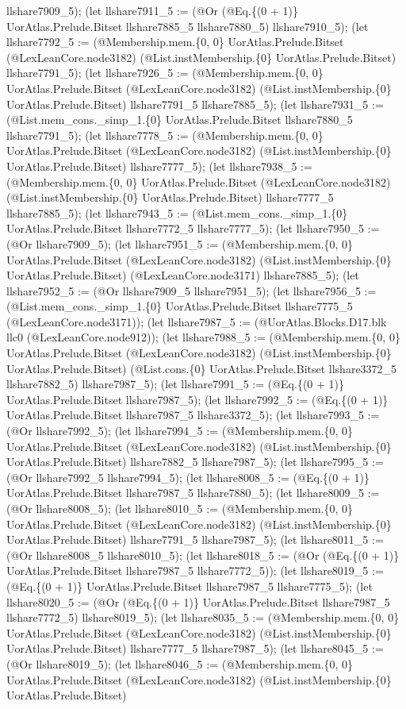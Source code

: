 \documentclass[11pt]{article}
\begin{document}
llshare7909\_5); (let llshare7911\_5 := (@Or (@Eq.\{(0 + 1)\} UorAtlas.Prelude.Bitset llshare7885\_5 llshare7880\_5) llshare7910\_5); (let llshare7792\_5 := (@Membership.mem.\{0, 0\} UorAtlas.Prelude.Bitset (@LexLeanCore.node3182) (@List.instMembership.\{0\} UorAtlas.Prelude.Bitset) llshare7791\_5); (let llshare7926\_5 := (@Membership.mem.\{0, 0\} UorAtlas.Prelude.Bitset (@LexLeanCore.node3182) (@List.instMembership.\{0\} UorAtlas.Prelude.Bitset) llshare7791\_5 llshare7885\_5); (let llshare7931\_5 := (@List.mem\_cons.\_simp\_1.\{0\} UorAtlas.Prelude.Bitset llshare7880\_5 llshare7791\_5); (let llshare7778\_5 := (@Membership.mem.\{0, 0\} UorAtlas.Prelude.Bitset (@LexLeanCore.node3182) (@List.instMembership.\{0\} UorAtlas.Prelude.Bitset) llshare7777\_5); (let llshare7938\_5 := (@Membership.mem.\{0, 0\} UorAtlas.Prelude.Bitset (@LexLeanCore.node3182) (@List.instMembership.\{0\} UorAtlas.Prelude.Bitset) llshare7777\_5 llshare7885\_5); (let llshare7943\_5 := (@List.mem\_cons.\_simp\_1.\{0\} UorAtlas.Prelude.Bitset llshare7772\_5 llshare7777\_5); (let llshare7950\_5 := (@Or llshare7909\_5); (let llshare7951\_5 := (@Membership.mem.\{0, 0\} UorAtlas.Prelude.Bitset (@LexLeanCore.node3182) (@List.instMembership.\{0\} UorAtlas.Prelude.Bitset) (@LexLeanCore.node3171) llshare7885\_5); (let llshare7952\_5 := (@Or llshare7909\_5 llshare7951\_5); (let llshare7956\_5 := (@List.mem\_cons.\_simp\_1.\{0\} UorAtlas.Prelude.Bitset llshare7775\_5 (@LexLeanCore.node3171)); (let llshare7987\_5 := (@UorAtlas.Blocks.D17.blk llc0 (@LexLeanCore.node912)); (let llshare7988\_5 := (@Membership.mem.\{0, 0\} UorAtlas.Prelude.Bitset (@LexLeanCore.node3182) (@List.instMembership.\{0\} UorAtlas.Prelude.Bitset) (@List.cons.\{0\} UorAtlas.Prelude.Bitset llshare3372\_5 llshare7882\_5) llshare7987\_5); (let llshare7991\_5 := (@Eq.\{(0 + 1)\} UorAtlas.Prelude.Bitset llshare7987\_5); (let llshare7992\_5 := (@Eq.\{(0 + 1)\} UorAtlas.Prelude.Bitset llshare7987\_5 llshare3372\_5); (let llshare7993\_5 := (@Or llshare7992\_5); (let llshare7994\_5 := (@Membership.mem.\{0, 0\} UorAtlas.Prelude.Bitset (@LexLeanCore.node3182) (@List.instMembership.\{0\} UorAtlas.Prelude.Bitset) llshare7882\_5 llshare7987\_5); (let llshare7995\_5 := (@Or llshare7992\_5 llshare7994\_5); (let llshare8008\_5 := (@Eq.\{(0 + 1)\} UorAtlas.Prelude.Bitset llshare7987\_5 llshare7880\_5); (let llshare8009\_5 := (@Or llshare8008\_5); (let llshare8010\_5 := (@Membership.mem.\{0, 0\} UorAtlas.Prelude.Bitset (@LexLeanCore.node3182) (@List.instMembership.\{0\} UorAtlas.Prelude.Bitset) llshare7791\_5 llshare7987\_5); (let llshare8011\_5 := (@Or llshare8008\_5 llshare8010\_5); (let llshare8018\_5 := (@Or (@Eq.\{(0 + 1)\} UorAtlas.Prelude.Bitset llshare7987\_5 llshare7772\_5)); (let llshare8019\_5 := (@Eq.\{(0 + 1)\} UorAtlas.Prelude.Bitset llshare7987\_5 llshare7775\_5); (let llshare8020\_5 := (@Or (@Eq.\{(0 + 1)\} UorAtlas.Prelude.Bitset llshare7987\_5 llshare7772\_5) llshare8019\_5); (let llshare8035\_5 := (@Membership.mem.\{0, 0\} UorAtlas.Prelude.Bitset (@LexLeanCore.node3182) (@List.instMembership.\{0\} UorAtlas.Prelude.Bitset) llshare7777\_5 llshare7987\_5); (let llshare8045\_5 := (@Or llshare8019\_5); (let llshare8046\_5 := (@Membership.mem.\{0, 0\} UorAtlas.Prelude.Bitset (@LexLeanCore.node3182) (@List.instMembership.\{0\} UorAtlas.Prelude.Bitset) 
\end{document}

